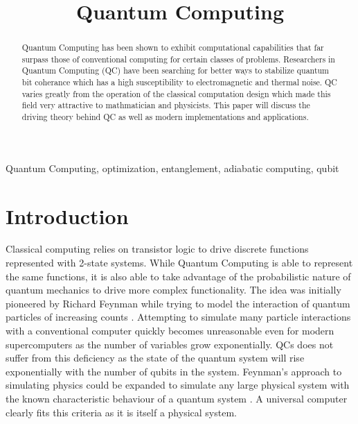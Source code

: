 \documentclass[conference]{IEEEtran}
\begin{document}
\title{Quantum Computing}

\author{
\and
{}
}

\maketitle

\begin{abstract}
Quantum Computing has been shown to exhibit computational capabilities that far surpass those of conventional computing for certain classes of problems. Researchers in Quantum Computing (QC) have been searching for better ways to stabilize quantum bit coherance which has a high susceptibility to electromagnetic and thermal noise. QC varies greatly from the operation of the classical computation design which made this field very attractive to mathmatician and physicists. This paper will discuss the driving theory behind QC as well as modern implementations and applications.
\end{abstract}

\begin{IEEEkeywords}
Quantum Computing, optimization, entanglement, adiabatic computing, qubit
\end{IEEEkeywords}

\section{Introduction}

Classical computing relies on transistor logic to drive discrete functions represented with 2-state systems. While Quantum Computing is able to represent the same functions, it is also able to take advantage of the probabilistic nature of quantum mechanics to drive more complex functionality. The idea was initially pioneered by Richard Feynman while trying to model the interaction of quantum particles of increasing counts \cite{b1}. Attempting to simulate many particle interactions with a conventional computer quickly becomes unreasonable even for modern supercomputers as the number of variables grow exponentially. QCs does not suffer from this deficiency as the state of the quantum system will rise exponentially with the number of qubits in the system. Feynman's approach to simulating physics could be expanded to simulate any large physical system with the known characteristic behaviour of a quantum system \cite{b2}. A universal computer clearly fits this criteria as it is itself a physical system.
\end{document}
